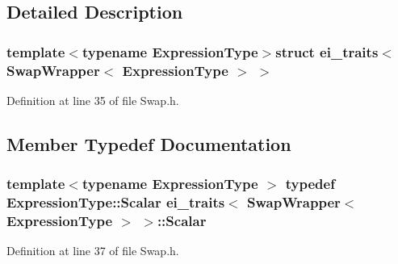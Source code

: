 \subsection{Detailed Description}
\subsubsection*{template$<$typename Expression\-Type$>$struct ei\-\_\-traits$<$ Swap\-Wrapper$<$ Expression\-Type $>$ $>$}



Definition at line 35 of file Swap.\-h.



\subsection{Member Typedef Documentation}
\hypertarget{structei__traits_3_01_swap_wrapper_3_01_expression_type_01_4_01_4_a4b2a47d42a42cfa2fc69c7353df75bc4}{
\subsubsection[{Scalar}]{\setlength{\rightskip}{0pt plus 5cm}template$<$typename Expression\-Type $>$ typedef Expression\-Type\-::\-Scalar {\bf ei\-\_\-traits}$<$ {\bf Swap\-Wrapper}$<$ Expression\-Type $>$ $>$\-::{\bf Scalar}}}\label{structei__traits_3_01_swap_wrapper_3_01_expression_type_01_4_01_4_a4b2a47d42a42cfa2fc69c7353df75bc4}


Definition at line 37 of file Swap.\-h.



